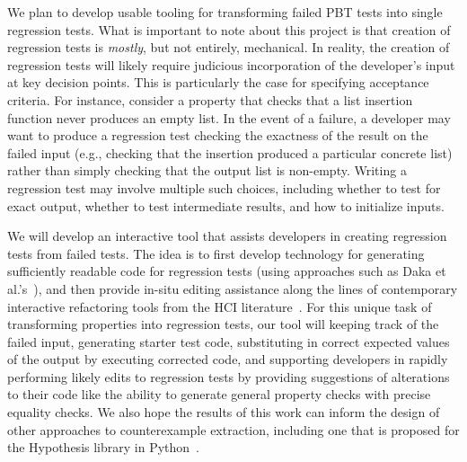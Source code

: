 We plan to develop usable tooling for transforming failed PBT tests into single
regression tests. What is important to note about this project is that creation
of regression tests is \emph{mostly}, but not entirely, mechanical. In reality,
the creation of regression tests will likely require judicious incorporation of
the developer's input at key decision points. This is particularly the case for
specifying acceptance criteria. For instance, consider a property that checks
that a list insertion function never produces an empty list. In the event of a
failure, a developer may want to produce a regression test checking the
exactness of the result on the failed input (e.g., checking that the insertion
produced a particular concrete list) rather than simply checking that the output
list is non-empty.  Writing a regression test may involve multiple such
choices, including whether to test for exact output, whether to test
intermediate results, and how to initialize inputs.

We will develop an interactive tool that assists developers in creating
regression tests from failed tests. The idea is to first develop
technology for generating sufficiently readable code for regression tests (using
approaches such as Daka et al.'s~\cite{ref:daka2015modeling}), and then provide
in-situ editing assistance along the lines of contemporary interactive
refactoring tools from the HCI
literature~\cite{ref:head2018interactive,ref:barik2016quick,ref:murphyhill2008refactoring,ref:lee2013draganddrop}.
For this unique task of transforming properties into regression tests,
our tool will \iflater{}\fi keeping track of the failed input,
generating starter test code, substituting in correct expected values of the
output by executing corrected code, and supporting developers in rapidly
performing likely edits to regression tests by providing suggestions of
alterations to their code like the ability to generate general property checks
with precise equality checks\iflater{}\fi. We also hope the results of this work
can inform the
design of other approaches to counterexample extraction, including one that is
proposed for the Hypothesis library in Python~\cite{maciver2019hypothesis}.


